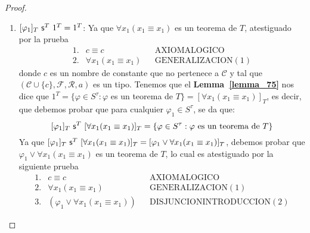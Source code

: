 \begin{proof}
\begin{enumerate}[(1)]
      \item $[\varphi_{1}]_{T} \ \mathsf{s}^{T} \ 1^{T} = 1^{T}$: Ya que $\forall x_{1} (x_{1} \equiv x_{1})$ es un teorema de
        $T$, atestiguado por la prueba
        \[
          \begin{array}{llll}
            1. & c \equiv c && \text{AXIOMALOGICO} \\
            2. & \forall x_{1} (x_{1} \equiv x_{1}) && \text{GENERALIZACION}(1)
          \end{array}
        \]
        \PN donde $c$ es un nombre de constante que no pertenece a $\mathcal{C}$ y tal que $(\mathcal{C} \cup \{c\},
        \mathcal{F}, \mathcal{R}, a)$ es un tipo. Tenemos que el \textbf{Lemma~\ref{lemma_75}} nos dice que $1^{T} =
        \{\varphi \in S^{\tau}: \varphi$ es un teorema de $T\} = [\forall x_{1} (x_{1} \equiv x_{1})]_{T}$, es decir,
        que debemos probar que para cualquier $\varphi_{1} \in S^{\tau}$, se da que:
        \[
          [\varphi_{1}]_{T} \ \SU^{T} \ [\forall x_{1} (x_{1} \equiv x_{1})]_{T} = \{\varphi \in S^{\tau}: \varphi \
          \text{es un teorema de} \ T\}
        \]
       \PN Ya que $[\varphi_{1}]_{T} \ \mathsf{s}^{T} \ [\forall x_{1} (x_{1} \equiv x_{1})]_{T} = [\varphi_{1} \vee \forall
       x_{1}(x_{1}\equiv x_{1})]_{T}$, debemos probar que $\varphi_{1} \vee \forall x_{1} (x_{1} \equiv x_{1})$ es un
       teorema de $T$, lo cual es atestiguado por la siguiente prueba
        \[
          \begin{array}{llll}
            1. & c \equiv c && \text{AXIOMALOGICO} \\
            2. & \forall x_{1} (x_{1} \equiv x_{1}) && \text{GENERALIZACION}(1) \\
            3. & (\varphi_{1} \vee \forall x_{1} (x_{1}\equiv x_{1})) && \text{DISJUNCIONINTRODUCCION}(2)
          \end{array}
        \]


\end{enumerate}
\end{proof}
